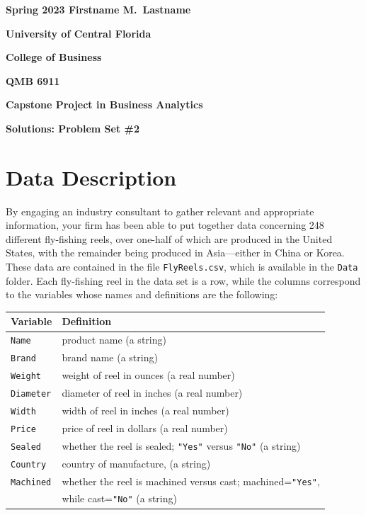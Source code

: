 \documentclass[11pt]{book}
\begin{document}

\pagestyle{empty}
{\noindent\bf Spring 2023 \hfill Firstname M.~Lastname}
\vskip 16pt
\centerline{\bf University of Central Florida}
\centerline{\bf College of Business}
\vskip 16pt
\centerline{\bf QMB 6911}
\centerline{\bf Capstone Project in Business Analytics}
\vskip 10pt
\centerline{\bf Solutions:  Problem Set \#2}
\vskip 32pt
\noindent
%
\section*{Data Description}
% 
By engaging an industry consultant to gather relevant and appropriate 
information, your firm has been able to put together data concerning 248 
different fly-fishing reels, over one-half of which are produced in the 
United States, with the remainder being produced in Asia---either in China 
or Korea.  These data are contained in the file {\tt FlyReels.csv}, which is
available in the {\tt Data} folder.
Each fly-fishing reel in the data set is a row, while the columns correspond 
to the variables whose names and definitions are the following:
\bigskip
\begin{table}[ht]
\centering
\begin{tabular}{ll}
  \hline
    Variable & Definition \\
  \hline

    {\tt Name}        &product name (a string) \\ 
    {\tt Brand}       &brand name (a string) \\ 
    {\tt Weight}      &weight of reel in ounces (a real number) \\ 
    {\tt Diameter}    &diameter of reel in inches (a real number) \\ 
    {\tt Width}       &width of reel in inches (a real number) \\ 
    {\tt Price}       &price of reel in dollars (a real number) \\ 
    {\tt Sealed}      &whether the reel is sealed; {\tt "Yes"} versus
                        {\tt "No"} (a string) \\ 
    {\tt Country}     &country of manufacture, (a string) \\ 
    {\tt Machined}    &whether the reel is machined versus cast;
                        machined={\tt "Yes"}, \\ 
                      &while cast={\tt "No"} (a string) \\ 
  \hline
\end{tabular}
\end{table}
\end{document}
